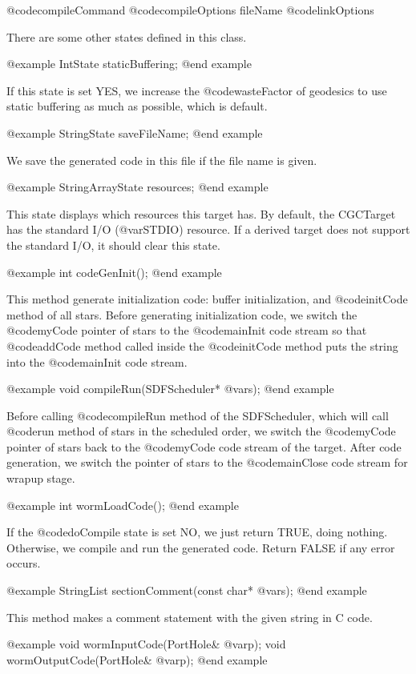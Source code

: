 {@code{compileCommand} @code{compileOptions} fileName @code{linkOptions}

There are some other states defined in this class.

@example
IntState staticBuffering;
@end example

If this state is set YES, we increase the @code{wasteFactor} of geodesics
to use static buffering as much as possible, which is default.

@example
StringState saveFileName;
@end example

We save the generated code in this file if the file name is given.

@example
StringArrayState resources;
@end example

This state displays which resources this target has. By default, the
CGCTarget has the standard I/O (@var{STDIO}) resource. If a derived
target does not support the standard I/O, it should clear this state.

@example
int codeGenInit();
@end example

This method generate initialization code: buffer initialization, and
@code{initCode} method of all stars. Before generating initialization code,
we switch the @code{myCode} pointer of stars to the @code{mainInit} code
stream so that @code{addCode} method called inside the @code{initCode}
method puts the string into the @code{mainInit} code stream.

@example
void compileRun(SDFScheduler* @var{s});
@end example

Before calling @code{compileRun} method of the SDFScheduler, which will
call @code{run} method of stars in the scheduled order, we switch the
@code{myCode} pointer of stars back to the @code{myCode} code stream
of the target. After code generation, we switch the pointer of stars to
the @code{mainClose} code stream for wrapup stage.

@example
int wormLoadCode();
@end example

If the @code{doCompile} state is set NO, we just return TRUE, doing nothing.
Otherwise, we compile and run the generated code. Return FALSE if any
error occurs.

@example
StringList sectionComment(const char* @var{s});
@end example

This method makes a comment statement with the given string in C code.

@example
void wormInputCode(PortHole& @var{p});
void wormOutputCode(PortHole& @var{p});
@end example

}
